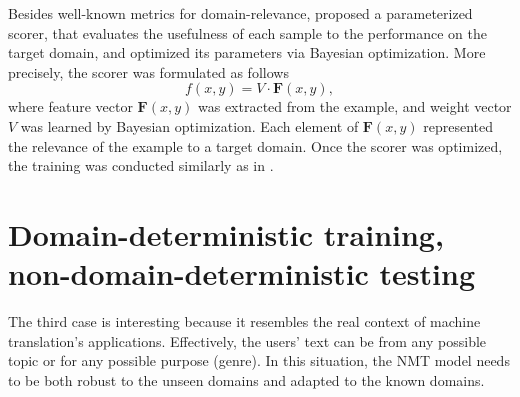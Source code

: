 Besides well-known metrics for domain-relevance, \citet{Zhang19curriculum} proposed a parameterized scorer, that evaluates the usefulness of each sample to the performance on the target domain, and optimized its parameters via Bayesian optimization. More precisely, the scorer was formulated as follows
\begin{equation}
\mathit{f}(x,y) = V \cdot \mathbf{F}(x,y),
\end{equation}
where feature vector $\mathbf{F}(x,y)$ was extracted from the example, and weight vector $V$ was learned by Bayesian optimization. Each element of $\mathbf{F}(x,y)$ represented the relevance of the example to a target domain. Once the scorer was optimized, the training was conducted similarly as in \citet{Wees17dynamic,Wang19dynamically}.

\section{Domain-deterministic training, non-domain-deterministic testing}
\label{sec:case3}
The third case is interesting because it resembles the real context of machine translation's applications. Effectively, the users' text can be from any possible topic or for any possible purpose (genre). In this situation, the NMT model needs to be both robust to the unseen domains and adapted to the known domains. 
